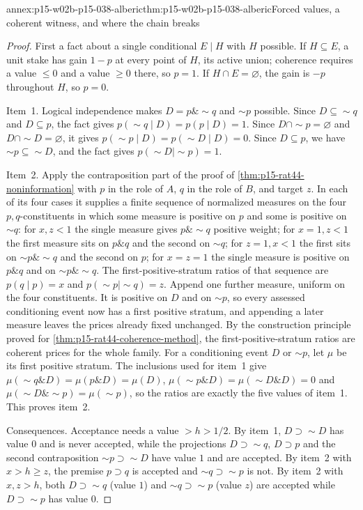 \begin{annexitem}{annex:p15-w02b-p15-038-alberic}{thm:p15-w02b-p15-038-alberic}{Forced values, a coherent witness, and where the chain breaks}
\begin{proof}
First a fact about a single conditional \(E\mid H\) with \(H\) possible.
If \(H\subseteq E\), a unit stake has gain \(1-p\) at every point of
\(H\), its active union; coherence requires a value \(\leq0\) and a value
\(\geq0\) there, so \(p=1\). If \(H\cap E=\varnothing\), the gain is
\(-p\) throughout \(H\), so \(p=0\).

Item~1. Logical independence makes \(D=p\mathbin{\&}\sim q\) and
\(\sim p\) possible. Since \(D\subseteq\sim q\) and \(D\subseteq p\),
the fact gives \(p(\sim q\mid D)=p(p\mid D)=1\). Since
\(D\cap\sim p=\varnothing\) and \(D\cap\sim D=\varnothing\), it gives
\(p(\sim p\mid D)=p(\sim D\mid D)=0\). Since \(D\subseteq p\), we have
\(\sim p\subseteq\sim D\), and the fact gives \(p(\sim D\mid\sim p)=1\).

Item~2. Apply the contraposition part of the proof of
\cref{thm:p15-rat44-noninformation} with \(p\) in the role of \(A\),
\(q\) in the role of \(B\), and target \(z\). In each of its four cases
it supplies a finite sequence of normalized measures on the four
\(p,q\)-constituents in which some measure is positive on \(p\) and
some is positive on \(\sim q\): for \(x,z<1\) the single measure gives
\(p\mathbin{\&}\sim q\) positive weight; for \(x=1,z<1\) the first
measure sits on \(p\mathbin{\&}q\) and the second on \(\sim q\); for
\(z=1,x<1\) the first sits on \(\sim p\mathbin{\&}\sim q\) and the
second on \(p\); for \(x=z=1\) the single measure is positive on
\(p\mathbin{\&}q\) and on \(\sim p\mathbin{\&}\sim q\). The
first-positive-stratum ratios of that sequence are \(p(q\mid p)=x\) and
\(p(\sim p\mid\sim q)=z\). Append one further measure, uniform on the
four constituents. It is positive on \(D\) and on \(\sim p\), so every
assessed conditioning event now has a first positive stratum, and
appending a later measure leaves the prices already fixed unchanged. By
the construction principle proved for
\cref{thm:p15-rat44-coherence-method}, the first-positive-stratum
ratios are coherent prices for the whole family. For a conditioning
event \(D\) or \(\sim p\), let \(\mu\) be its first positive stratum.
The inclusions used for item~1 give
\(\mu(\sim q\mathbin{\&}D)=\mu(p\mathbin{\&}D)=\mu(D)\),
\(\mu(\sim p\mathbin{\&}D)=\mu(\sim D\mathbin{\&}D)=0\) and
\(\mu(\sim D\mathbin{\&}\sim p)=\mu(\sim p)\), so the ratios are
exactly the five values of item~1. This proves item~2.

Consequences. Acceptance needs a value \(>h>1/2\). By item~1,
\(D\supset\sim D\) has value \(0\) and is never accepted, while the
projections \(D\supset\sim q\), \(D\supset p\) and the second
contraposition \(\sim p\supset\sim D\) have value \(1\) and are
accepted. By item~2 with \(x>h\geq z\), the premise \(p\supset q\) is
accepted and \(\sim q\supset\sim p\) is not. By item~2 with
\(x,z>h\), both \(D\supset\sim q\) (value \(1\)) and
\(\sim q\supset\sim p\) (value \(z\)) are accepted while
\(D\supset\sim p\) has value \(0\).
\end{proof}
\end{annexitem}


